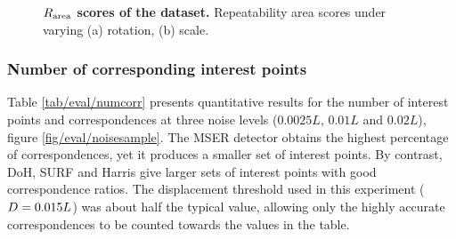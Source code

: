 \begin{figure}[ht]
\begin{subfigure}[t]{0.48\linewidth}
		\label{fig/eval/graph_scaling}
	\end{subfigure}
	\caption{\textbf{$R_\textrm{area}$ scores of the \meshset dataset.} Repeatability area scores under varying (a) rotation, (b) scale.}
	\label{fig/eval/graph_graph1} 
\end{figure}

\subsubsection{Number of corresponding interest points}

Table \ref{tab/eval/numcorr} presents quantitative results for the number of interest points and correspondences at three noise levels ($0.0025L$, $0.01L$ and $0.02L$), \cf figure \ref{fig/eval/noisesample}.
The MSER detector obtains the highest percentage of correspondences, yet it produces a smaller set of interest points. By contrast, DoH, SURF and Harris give larger sets of interest points with good correspondence ratios. The displacement threshold used in this experiment ($D = 0.015L$) was about half the typical value, allowing only the highly accurate correspondences to be counted towards the values in the table. 

